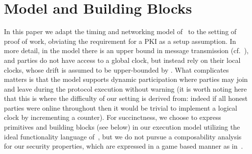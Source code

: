 \section{Model and Building Blocks}
\label{sec:model}

In this paper we adapt the timing and networking model of~\cite{EC:BGKRZ21} to the setting of proof of work, obviating the requirement for a PKI as a setup assumption.
%
In more detail, in the model there is an upper bound \delay in message transmission (cf.~\cite{JACM:DwoLynSto88,EC:PasSeeash17,C:BMTZ17,EPRINT:GarKiaLeo20}), and parties do not have access to a global clock, but instead rely on their local clocks, whose drift is assumed to be upper-bounded by \maxdrift.
%
What complicates matters is that the model supports dynamic participation where parties may join and leave during the protocol execution without warning (it is worth noting here that this is where the difficulty of our setting is derived from: indeed if all honest parties were online throughout then it would be trivial to implement a logical clock by incrementing a counter).
%
For succinctness, we choose to express primitives and building blocks (see below) in our execution model utilizing the ideal functionality language of~\cite{FOCS:Canetti01}, but we do not pursue a composability analysis for our security properties, which are expressed in a game based manner as in~\cite{EC:GarKiaLeo15,EC:PasSeeash17}.




